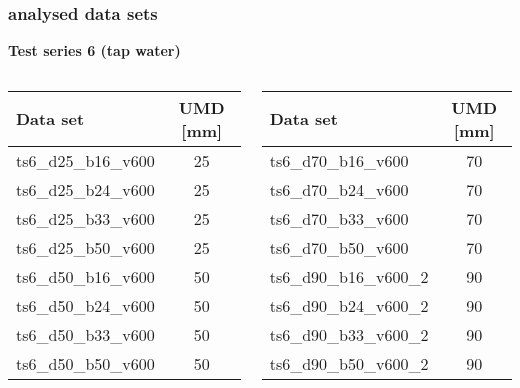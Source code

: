 	\begin{frame}
		\frametitle{\appendixname{} \textendash{} analysed data sets}\label{app:dataset:ts6}
		\textbf{Test series 6 (tap water)}\autocite{ts6data}\\
		\vspace*{1em}
		\begin{columns}[t]
			\begin{column}{.5\textwidth}
				\begin{tabular}{l c}
					\toprule
					Data set            & UMD [mm] \\ \midrule
					ts6\_d25\_b16\_v600 & 25       \\
					ts6\_d25\_b24\_v600 & 25       \\
					ts6\_d25\_b33\_v600 & 25       \\
					ts6\_d25\_b50\_v600 & 25       \\
					ts6\_d50\_b16\_v600 & 50       \\
					ts6\_d50\_b24\_v600 & 50       \\
					ts6\_d50\_b33\_v600 & 50       \\
					ts6\_d50\_b50\_v600 & 50       \\ \bottomrule
				\end{tabular}
			\end{column}
			\begin{column}{.5\textwidth}
				\begin{tabular}{l c}
					\toprule
					Data set               & UMD [mm] \\ \midrule
					ts6\_d70\_b16\_v600    & 70       \\
					ts6\_d70\_b24\_v600    & 70       \\
					ts6\_d70\_b33\_v600    & 70       \\
					ts6\_d70\_b50\_v600    & 70       \\
					ts6\_d90\_b16\_v600\_2 & 90       \\
					ts6\_d90\_b24\_v600\_2 & 90       \\
					ts6\_d90\_b33\_v600\_2 & 90       \\
					ts6\_d90\_b50\_v600\_2 & 90       \\ \bottomrule
				\end{tabular}
			\end{column}
		\end{columns}
	\end{frame}

